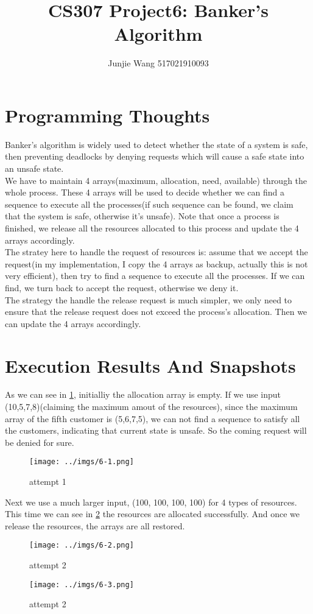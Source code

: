 \documentclass[12pt]{extarticle}
\title{CS307 Project6: Banker's Algorithm}
\author{Junjie Wang 517021910093}
\newcommand{\<}{\langle}
\renewcommand{\>}{\rangle}
\theoremstyle{definition}
\begin{document}
	\maketitle
	\section{Programming Thoughts}
	Banker's algorithm is widely used to detect whether the state of a system is safe, then preventing deadlocks by denying requests which will cause a safe state into an unsafe state. \\
	We have to maintain 4 arrays(maximum, allocation, need, available) through the whole process. These 4 arrays will be used to decide whether we can find a sequence to execute all the processes(if such sequence can be found, we claim that the system is safe, otherwise it's unsafe). Note that once a process is finished, we release all the resources allocated to this process and update the 4 arrays accordingly.\\
	The stratey here to handle the request of resources is: assume that we accept the request(in my implementation, I copy the 4 arrays as backup, actually this is not very efficient), then try to find a sequence to execute all the processes. If we can find, we turn back to accept the request, otherwise we deny it. \\
	The strategy the handle the release request is much simpler, we only need to ensure that the release request does not exceed the process's allocation. Then we can update the 4 arrays accordingly.
	\section{Execution Results And Snapshots}
	As we can see in \ref{fig1}, initialliy the allocation array is empty. If we use input (10,5,7,8)(claiming the maximum amout of the resources), since the maximum array of the fifth customer is (5,6,7,5), we can not find a sequence to satisfy all the customers, indicating that current state is unsafe. So the coming request will be denied for sure.
	\begin{figure}[H]
	\centering 
	\texttt{[image: ../imgs/6-1.png]}
	\caption{attempt 1}
	\label{fig1}
	\end{figure}
	Next we use a much larger input, (100, 100, 100, 100) for 4 types of resources. This time we can see in \ref{fig2} the resources are allocated successfully. And once we release the resources, the arrays are all restored.
	\begin{figure}[H]
		\centering 
		\texttt{[image: ../imgs/6-2.png]}
		\caption{attempt 2}
		\label{fig2}
	\end{figure}\begin{figure}[H]
	\centering 
	\texttt{[image: ../imgs/6-3.png]}
	\caption{attempt 2}
	\label{fig3}
\end{figure}
\end{document}
